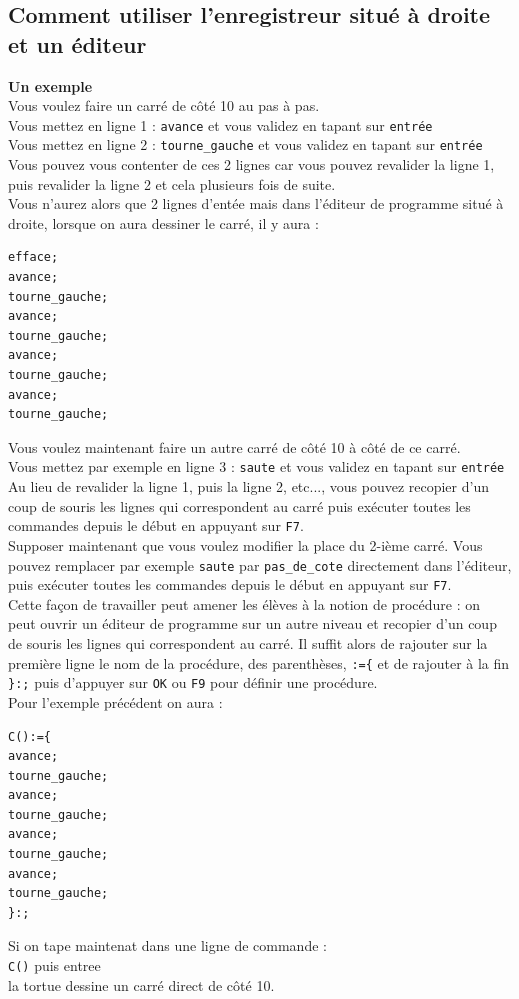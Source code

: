 \documentclass[a4paper,11pt]{book}
\begin{document}
\subsection{Comment utiliser l'enregistreur situ\'e \`a droite et un \'editeur}
{\bf Un exemple}\\
Vous voulez faire un carr\'e de c\^ot\'e 10 au pas \`a pas. \\
Vous mettez en ligne 1 : {\tt avance} et vous validez en tapant sur 
{\tt entr\'ee}\\
Vous mettez en ligne 2 : {\tt tourne\_gauche} et vous validez en tapant sur 
{\tt entr\'ee}\\
Vous pouvez vous contenter de ces 2 lignes car vous pouvez revalider la ligne 1,
puis  revalider la ligne 2 et cela plusieurs fois de suite.\\
Vous n'aurez alors que 2 lignes d'ent\'ee mais dans l'\'editeur de programme 
situ\'e \`a droite, lorsque on aura dessiner le carr\'e, il y aura :
\begin{verbatim}
efface;
avance;
tourne_gauche;
avance;
tourne_gauche;
avance;
tourne_gauche;
avance;
tourne_gauche;
\end{verbatim}
Vous voulez maintenant faire un autre carr\'e de c\^ot\'e 10 \`a c\^ot\'e de
ce carr\'e. \\
Vous mettez par exemple en ligne 3 : {\tt saute} et vous validez en tapant sur 
{\tt entr\'ee}\\
Au lieu de revalider la ligne 1, puis la ligne 2, etc..., vous pouvez recopier 
d'un coup de souris les lignes qui correspondent au carr\'e puis ex\'ecuter 
toutes les commandes depuis le d\'ebut en appuyant sur {\tt F7}.\\
Supposer maintenant que vous voulez modifier la place du 2-i\`eme carr\'e.
Vous pouvez remplacer par exemple {\tt saute} par {\tt pas\_de\_cote} 
directement dans l'\'editeur, puis ex\'ecuter toutes 
les commandes depuis le d\'ebut en appuyant sur {\tt F7}.\\
Cette fa\c{c}on de travailler peut amener les \'el\`eves \`a la notion de
proc\'edure : on peut ouvrir un \'editeur de programme sur un autre niveau et 
recopier d'un coup de souris les lignes qui correspondent au carr\'e. Il suffit
alors de rajouter sur la premi\`ere ligne le nom de la proc\'edure, des 
parenth\`eses, {\tt :=\{} et de rajouter \`a la fin {\tt \}:;} puis d'appuyer 
sur {\tt OK} ou {\tt F9} pour d\'efinir une proc\'edure. \\
Pour l'exemple pr\'ec\'edent on aura :
\begin{verbatim}
C():={
avance;
tourne_gauche;
avance;
tourne_gauche;
avance;
tourne_gauche;
avance;
tourne_gauche;
}:;
\end{verbatim}
Si on tape maintenat dans une ligne de commande :\\
{\tt C()} puis entree\\
la tortue dessine un carr\'e direct de c\^ot\'e 10.
\end{document}
